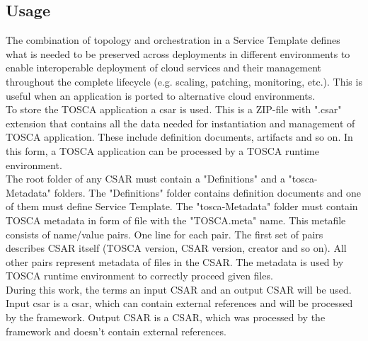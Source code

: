 \subsection*{Usage}
The combination of topology and orchestration in a Service Template defines what is needed to be preserved across deployments in different environments to enable interoperable deployment of cloud services and their management throughout the complete lifecycle (e.g. scaling, patching, monitoring, etc.).
This is useful when an application is ported to alternative cloud environments.~\cite{TOSCA-v1.0_book} \\
%
%
To store the TOSCA application a \gls{csar}\label{sec:csar} is used.
This is a ZIP-file with ".csar" extension that contains all the data needed for instantiation and management of TOSCA application.
These include definition documents, artifacts and so on.
In this form, a TOSCA application can be processed by a TOSCA runtime environment.\\
The root folder of any CSAR must contain a "Definitions" and a "\gls{tosca}-Metadata" folders.
The "Definitions" folder contains definition documents and one of them must define Service Template.
The "\gls{tosca}-Metadata" folder must contain TOSCA metadata in form of file with the "TOSCA.meta" name.
This metafile consists of name/value pairs. 
One line for each pair. 
The first set of pairs describes CSAR itself (TOSCA version, CSAR version, creator and so on). 
All other pairs represent metadata of files in the CSAR. 
The metadata is used by TOSCA runtime environment to correctly proceed given files.\\
%
During this work, the terms an input CSAR and an output CSAR will be used.
Input \gls{csar} is a \gls{csar}, which can contain external references and will be processed by the framework. %
Output CSAR is a CSAR, which was processed by the framework and doesn't contain external references. %


